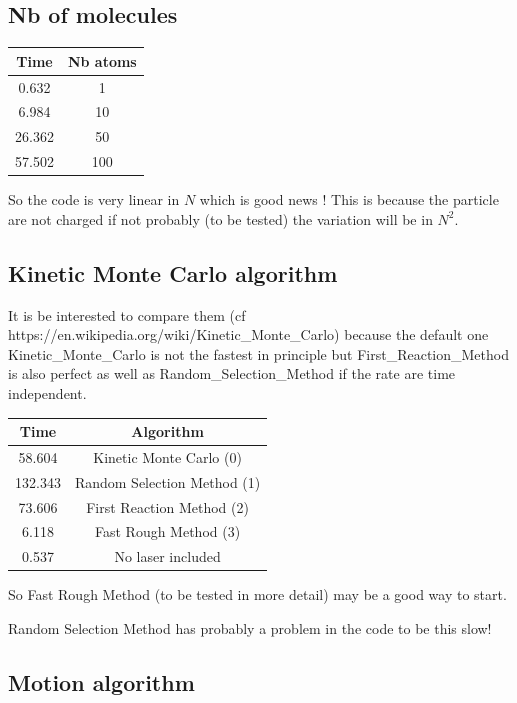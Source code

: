 \documentclass[amsmath,amssymb,nofootinbib]{revtex4-2}
\begin{document}
	 
	 \subsection{Nb of molecules}
	 
	 \begin{tabular}{|c|c|}
	 	\hline
Time & Nb atoms \\
\hline
\hline
0.632 & 1 \\
\hline
	 6.984 & 10  \\
	 \hline
	26.362  & 50 \\
	 57.502 & 100 \\
	 \hline
	\end{tabular}

	 So the code is very linear in $N$ which is good news ! This is because the particle are not charged if not probably (to be tested) the variation will be in $N^2$.
	 
	  \subsection{Kinetic Monte Carlo algorithm}
	  
It is be interested to compare them (cf
	  	https://en.wikipedia.org/wiki/Kinetic\_Monte\_Carlo)
	  	because the default one 
	  	Kinetic\_Monte\_Carlo
	  	is not the fastest in principle but First\_Reaction\_Method
	  	is also perfect as well as Random\_Selection\_Method if the rate are time independent.
	  	
	  
	
	 
	 \begin{tabular}{|c|c|}
	 	\hline
	 	Time & Algorithm \\
	 	\hline
	 	\hline
	 	58.604 & Kinetic Monte Carlo (0) \\
	 	\hline
	 	132.343 & Random Selection Method (1)  \\
	 	\hline
	 	73.606  & First Reaction Method (2) \\
	 		\hline
	 	6.118 & Fast Rough Method (3)  \\
	 	\hline
	0.537 	 &  No laser included \\
	 	\hline
	 \end{tabular}
 
	 So Fast Rough Method (to be tested in more detail) may be a good way to start.
	 
Random Selection Method  has probably a problem in the code to be this slow!
	 
	 
	 
	 \subsection{Motion algorithm}
	 
\end{document}
